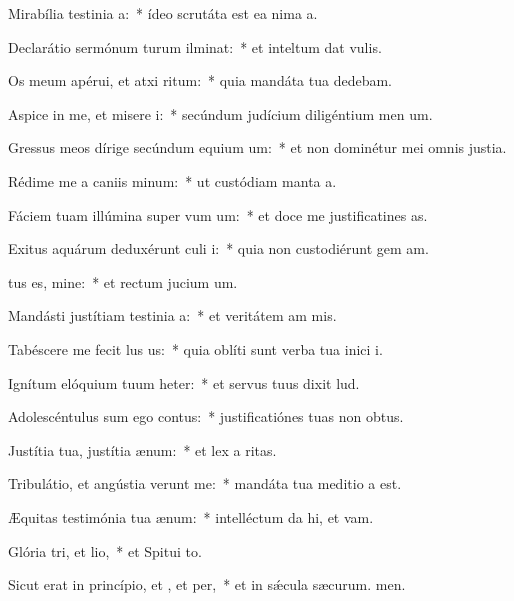 \item Mirabília testinia a:~* ídeo scrutáta est ea nima a.
\item Declarátio sermónum turum ilminat:~* et inteltum dat vulis.
\item Os meum apérui, et atxi ritum:~* quia mandáta tua dedebam.
\item Aspice in me, et misere i:~* secúndum judícium diligéntium men um.
\item Gressus meos dírige secúndum equium um:~* et non dominétur mei omnis justia.
\item Rédime me a caniis minum:~* ut custódiam manta a.
\item Fáciem tuam illúmina super vum um:~* et doce me justificatines as.
\item Exitus aquárum deduxérunt culi i:~* quia non custodiérunt gem am.
\item {}tus es, mine:~* et rectum jucium um.
\item Mandásti justítiam testinia a:~* et veritátem am mis.
\item Tabéscere me fecit lus us:~* quia oblíti sunt verba tua inici i.
\item Ignítum elóquium tuum heter:~* et servus tuus dixit lud.
\item Adolescéntulus sum ego  contus:~* justificatiónes tuas non  obtus.
\item Justítia tua, justítia  ænum:~* et lex a ritas.
\item Tribulátio, et angústia verunt me:~* mandáta tua meditio a est.
\item Æquitas testimónia tua  ænum:~* intelléctum da hi, et vam.
\item Glória tri, et lio,~* et Spitui to.
\item Sicut erat in princípio, et , et per,~* et in sǽcula sæcurum. men.
